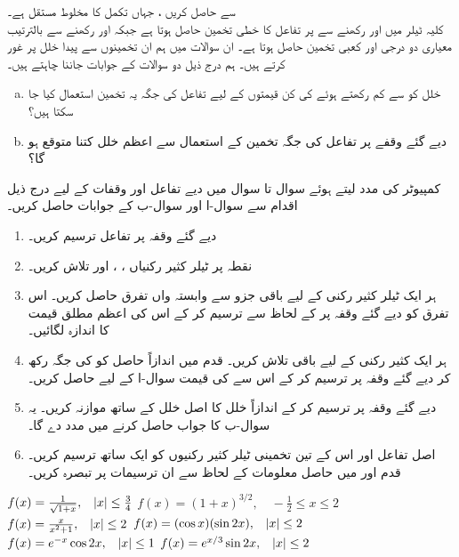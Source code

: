 سے حاصل کریں ، جہاں  تکمل کا مخلوط مستقل ہے۔
\\
کلیہ ٹیلر میں  اور  رکھنے  سے  پر تفاعل کا خطی تخمین حاصل ہوتا ہے جبکہ  اور  رکھنے سے بالترتیب معیاری دو درجی اور کعبی تخمین حاصل ہوتا ہے۔ ان سوالات میں ہم ان تخمینوں سے پیدا خلل پر غور کرتے ہیں۔ ہم  درج ذیل دو سوالات کے جوابات جاننا چاہتے ہیں۔
\begin{enumerate}[a.]
\item
خلل کو  سے کم رکھتے ہوئے  کی کن قیمتوں کے لیے تفاعل کی جگہ یہ تخمین استعمال کیا جا سکتا ہیں؟
\item
دیے گئے    وقفے  پر تفاعل کی جگہ  تخمین کے استعمال سے اعظم خلل کتنا متوقع ہو گا؟
\end{enumerate}
کمپیوٹر کی مدد لیتے ہوئے سوال  تا سوال  میں دیے تفاعل اور وقفات کے لیے  درج ذیل اقدام سے سوال-ا اور سوال-ب کے جوابات حاصل کریں۔
\begin{enumerate}[1.]
\item
دیے گئے وقفہ پر تفاعل ترسیم کریں۔
\item
نقطہ  پر ٹیلر کثیر رکنیاں ، ،  اور  تلاش کریں۔ 
\item
ہر ایک ٹیلر کثیر رکنی کے لیے باقی جزو سے وابستہ   واں تفرق  حاصل کریں۔ اس تفرق کو دیے گئے وقفہ پر   کے لحاظ سے ترسیم کر کے اس کی اعظم مطلق قیمت  کا اندازہ لگائیں۔
\item
ہر ایک کثیر رکنی کے لیے باقی  تلاش کریں۔ قدم  میں  اندازاً حاصل  کو  کی جگہ  رکھ کر  دیے گئے وقفہ پر  ترسیم کر کے اس سے  کی قیمت  سوال-ا  کے لیے حاصل کریں۔
\item
دیے گئے وقفہ پر  ترسیم کر کے  اندازاً خلل کا اصل خلل  کے ساتھ موازنہ کریں۔ یہ سوال-ب کا جواب حاصل کرنے میں مدد دے  گا۔
\item
اصل تفاعل اور اس کے تین تخمینی ٹیلر کثیر رکنیوں کو ایک ساتھ ترسیم کریں۔قدم  اور  میں حاصل معلومات کے لحاظ سے ان ترسیمات پر تبصرہ کریں۔

\end{enumerate}

$f(x)=\tfrac{1}{\sqrt{1+x}},\quad \abs{x}\le \tfrac{3}{4}$
$f(x)=(1+x)^{3/2},\quad -\tfrac{1}{2}\le x\le 2$
$f(x)=\tfrac{x}{x^2+1},\quad \abs{x}\le 2$
$f(x)=(\cos x)(\sin 2x),\quad \abs{x}\le 2$
$f(x)=e^{-x}\cos 2x,\quad \abs{x}\le 1$
$f(x)=e^{x/3}\sin 2x,\quad \abs{x}\le 2$

